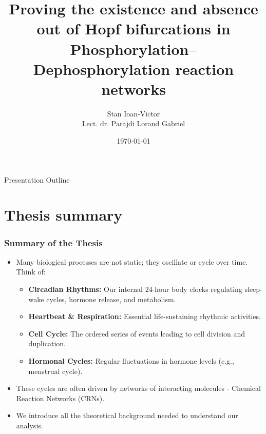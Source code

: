 \documentclass[aspectratio=169]{beamer}
\title[Hopf Bifurcations in CRNs]{Proving the existence and absence out of Hopf bifurcations in Phosphorylation–Dephosphorylation reaction networks}
\author{Stan Ioan-Victor \\[3mm] Lect. dr. Parajdi Lorand Gabriel}
\date{\today}
\institute{UBB MIE3}
\begin{document}
\begin{frame}[plain]
\titlepage
\end{frame}

\begin{frame}{Presentation Outline}
\tableofcontents
\end{frame}

\section{Thesis summary}

\begin{frame}{\insertsectionhead}
\frametitle{Summary of the Thesis}
\begin{itemize}
	\item Many biological processes are not static; they \alert{oscillate} or cycle over time. Think of:
		\begin{itemize}
			\item \textbf{Circadian Rhythms:} Our internal 24-hour body clocks regulating sleep-wake cycles, hormone release, and metabolism.
			\item \textbf{Heartbeat \& Respiration:} Essential life-sustaining rhythmic activities.
			\item \textbf{Cell Cycle:} The ordered series of events leading to cell division and duplication.
			\item \textbf{Hormonal Cycles:} Regular fluctuations in hormone levels (e.g., menstrual cycle).
		\end{itemize}
	\item These cycles are often driven by networks of interacting molecules - \alert{Chemical Reaction Networks (CRNs)}.
	\item We introduce all the theoretical background needed to understand our analysis.
\end{itemize}
\end{frame}
\end{document}
